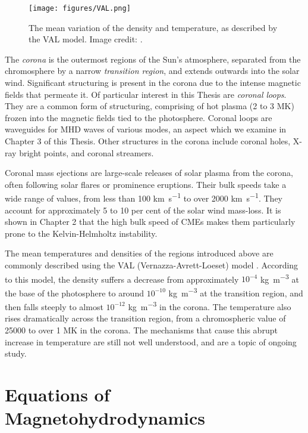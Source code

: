 \begin{figure}[h]
\centering
\texttt{[image: figures/VAL.png]}
\caption{The mean variation of the density and temperature, as described by the VAL  model. Image credit: \cite{Avrett2008}.
}
\label{fig:val}
\end{figure}

The \emph{corona} is the outermost regions of the Sun's atmosphere, separated from the chromosphere by a narrow \emph{transition region}, and extends outwards into the solar wind.
Significant structuring is present in the corona due to the intense magnetic fields that permeate it.
Of particular interest in this Thesis are \emph{coronal loops}.
They are a common form of structuring, comprising of hot plasma (2 to 3 \si{MK}) frozen into the magnetic fields tied to the photosphere.
Coronal loops are waveguides for MHD waves of various modes, an aspect which we examine in Chapter 3 of this Thesis.
Other structures in the corona include coronal holes, X-ray bright points, and coronal streamers.

Coronal mass ejections are large-scale releases of solar plasma from the corona, often following solar flares or prominence eruptions.
Their bulk speeds take a wide range of values, from less than 100 \si{km.s^{-1}} to over 2000 \si{km.s^{-1}}.
They account for approximately 5 to 10 per cent of the solar wind mass-loss.
It is shown in Chapter 2 that the high bulk speed of CMEs makes them particularly prone to the Kelvin-Helmholtz instability.

The mean temperatures and densities of the regions introduced above are commonly described using the VAL (Vernazza-Avrett-Loeset) model \citep{Vernazza1981, Avrett2008}.
According to this model, the density suffers a decrease from approximately $10^{-4}$ \si{kg.m^{-3}} at the base of the photosphere to around $10^{-10}$ \si{kg.m^{-3}} at the transition region, and then falls steeply to almost $10^{-12}$ \si{kg.m^{-3}} in the corona.
The temperature also rises dramatically across the transition region, from a chromospheric value of \num{25000} to over 1 \si{MK} in the corona.
The mechanisms that cause this abrupt increase in temperature are still not well understood, and are a topic of ongoing study.

\section{Equations of Magnetohydrodynamics}
\label{sec:mhdeqns}

